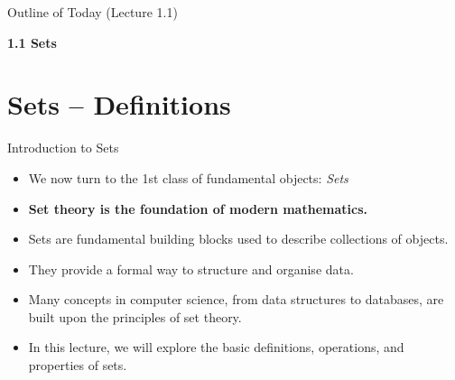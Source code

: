 \documentclass[11pt,aspectratio=1610]{beamer}
\begin{document}
	
	\hypersetup{linkcolor=blue}
	\begin{frame}{Outline of Today (Lecture 1.1)}
		
		
		\hspace{15mm}\begin{minipage}{0.4\textwidth}

		\tableofcontents[sections={1}]
		\vspace{2mm}
		 
			
					
					\textbf{1.1 Sets}\\
					\vspace{2mm}
					
					\tableofcontents[sections={2-6}]
					
      \end{minipage}
      \begin{minipage}{0.4\textwidth}
      	\vspace{21mm}
        	
      	\tableofcontents[sections={7-15}]
      	
      \end{minipage}
		
	\end{frame}
	\hypersetup{linkcolor=mygray}


			
%	
	


\section{Sets -- Definitions}

\begin{frame}{Introduction to Sets}
\begin{itemize}\itemsep5mm
	\item We now turn to the 1st class of fundamental objects: \emph{\Large Sets} \p


	\item	\textbf{\Large Set theory is the foundation of modern mathematics.} \p
	
	

	


		\item Sets are fundamental building blocks used to describe collections of objects.\p
		\item They provide a formal way to structure and organise data.\p
		\item Many concepts in computer science, from data structures to databases, are built upon the principles of set theory.\p
		\item In this lecture, we will explore the basic definitions, operations, and properties of sets.
	\end{itemize}
\end{frame}
\end{document}
